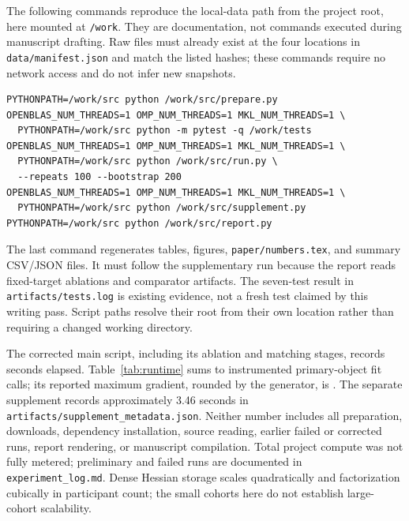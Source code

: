 The following commands reproduce the local-data path from the project root, here mounted at \texttt{/work}. They are documentation, not commands executed during manuscript drafting. Raw files must already exist at the four locations in \texttt{data/manifest.json} and match the listed hashes; these commands require no network access and do not infer new snapshots.
\begin{verbatim}
PYTHONPATH=/work/src python /work/src/prepare.py
OPENBLAS_NUM_THREADS=1 OMP_NUM_THREADS=1 MKL_NUM_THREADS=1 \
  PYTHONPATH=/work/src python -m pytest -q /work/tests
OPENBLAS_NUM_THREADS=1 OMP_NUM_THREADS=1 MKL_NUM_THREADS=1 \
  PYTHONPATH=/work/src python /work/src/run.py \
  --repeats 100 --bootstrap 200
OPENBLAS_NUM_THREADS=1 OMP_NUM_THREADS=1 MKL_NUM_THREADS=1 \
  PYTHONPATH=/work/src python /work/src/supplement.py
PYTHONPATH=/work/src python /work/src/report.py
\end{verbatim}
The last command regenerates tables, figures, \texttt{paper/numbers.tex}, and summary CSV/JSON files. It must follow the supplementary run because the report reads fixed-target ablations and comparator artifacts. The seven-test result in \texttt{artifacts/tests.log} is existing evidence, not a fresh test claimed by this writing pass. Script paths resolve their root from their own location rather than requiring a changed working directory.

\begin{table}[htbp]
\centering
\caption{Recorded per-dataset runtime instrumentation from the corrected main run. Fits count calls registered on each primary dataset's BT object; auxiliary bootstrap-pseudodataset, matching, and supplementary objects are not a complete project fit count. Seconds are measured per-dataset blocks, not hardware-normalized estimates. Gradient maxima are rounded. Source: \texttt{artifacts/runtime.csv}; generated input: \texttt{paper/tables/runtime.tex}.}
\label{tab:runtime}
{\small}
\end{table}

The corrected main script, including its ablation and matching stages, records \MainSeconds{} seconds elapsed. Table~\ref{tab:runtime} sums to \MainFitCount{} instrumented primary-object fit calls; its reported maximum gradient, rounded by the generator, is \texttt{\MaxGradient}. The separate supplement records approximately 3.46 seconds in \texttt{artifacts/supplement\_metadata.json}. Neither number includes all preparation, downloads, dependency installation, source reading, earlier failed or corrected runs, report rendering, or manuscript compilation. Total project compute was not fully metered; preliminary and failed runs are documented in \texttt{experiment\_log.md}. Dense Hessian storage scales quadratically and factorization cubically in participant count; the small cohorts here do not establish large-cohort scalability.

